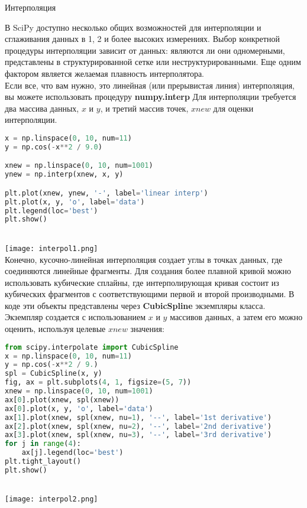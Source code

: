 \documentclass{article}
\begin{document}
\begin{section}{Интерполяция}


В SciPy доступно несколько общих возможностей для интерполяции и сглаживания данных в 1, 2 и более высоких измерениях. Выбор конкретной процедуры интерполяции зависит от данных: являются ли они одномерными, представлены в структурированной сетке или неструктурированными. Еще одним фактором является желаемая плавность интерполятора.
\\
Если все, что вам нужно, это линейная (или прерывистая линия) интерполяция, вы можете использовать процедуру \textbf{numpy.interp} Для интерполяции требуется два массива данных, $x$ и $y$, и третий массив точек, $xnew$ для оценки интерполяции.
\\
\begin{lstlisting}[language=Python]
x = np.linspace(0, 10, num=11)
y = np.cos(-x**2 / 9.0)

xnew = np.linspace(0, 10, num=1001)
ynew = np.interp(xnew, x, y)

plt.plot(xnew, ynew, '-', label='linear interp')
plt.plot(x, y, 'o', label='data')
plt.legend(loc='best')
plt.show()
\end{lstlisting}
\\
\texttt{[image: interpol1.png]}
\\
Конечно, кусочно-линейная интерполяция создает углы в точках данных, где соединяются линейные фрагменты. Для создания более плавной кривой можно использовать кубические сплайны, где интерполирующая кривая состоит из кубических фрагментов с соответствующими первой и второй производными. В коде эти объекты представлены через \textbf{CubicSpline} экземпляры класса. Экземпляр создается с использованием $x$ и $y$ массивов данных, а затем его можно оценить, используя целевые $xnew$ значения:
\\
\begin{lstlisting}[language=Python]
from scipy.interpolate import CubicSpline
x = np.linspace(0, 10, num=11)
y = np.cos(-x**2 / 9.)
spl = CubicSpline(x, y)
fig, ax = plt.subplots(4, 1, figsize=(5, 7))
xnew = np.linspace(0, 10, num=1001)
ax[0].plot(xnew, spl(xnew))
ax[0].plot(x, y, 'o', label='data')
ax[1].plot(xnew, spl(xnew, nu=1), '--', label='1st derivative')
ax[2].plot(xnew, spl(xnew, nu=2), '--', label='2nd derivative')
ax[3].plot(xnew, spl(xnew, nu=3), '--', label='3rd derivative')
for j in range(4):
    ax[j].legend(loc='best')
plt.tight_layout()
plt.show()
\end{lstlisting}
\\
\texttt{[image: interpol2.png]}
\end{section}
\end{document}
